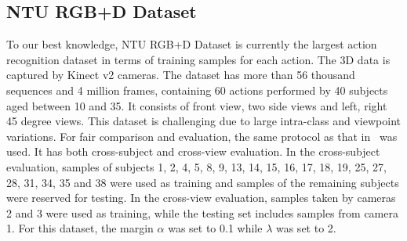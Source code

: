 \documentclass[letterpaper]{article} %
\begin{document}
 \begin{table*}[htbp]\small
\setlength{\belowcaptionskip}{9pt}
\caption{Comparative accuracies of the proposed method and previous methods on NTU RGB+D Dataset.\label{tableNTU} }
  \centering
{}
\end{table*}

\subsection{ NTU RGB+D Dataset}
 To our best knowledge, NTU RGB+D Dataset is currently the largest action
recognition dataset in terms of training samples for each action. The 3D data is
captured by Kinect v2 cameras. The dataset has more than 56 thousand sequences
and 4 million frames, containing 60 actions performed by 40 subjects aged
between 10 and 35. It consists of front view, two side views and left, right 45
degree views. This dataset is challenging due to large intra-class and
viewpoint variations. For fair comparison and evaluation, the same protocol as
that in~\cite{shahroudy2016ntu} was used. It has both cross-subject and
cross-view evaluation. In the cross-subject evaluation, samples of subjects 1,
2, 4, 5, 8,
9, 13, 14, 15, 16, 17, 18, 19, 25, 27, 28, 31, 34, 35 and 38 were used as
training and samples of the remaining subjects were reserved for testing. In the
cross-view evaluation, samples taken by cameras 2 and 3 were used as training,
while the testing set includes samples from camera 1. For this dataset, the
margin $\alpha$ was set to 0.1 while $\lambda$ was set to 2.
\end{document}
